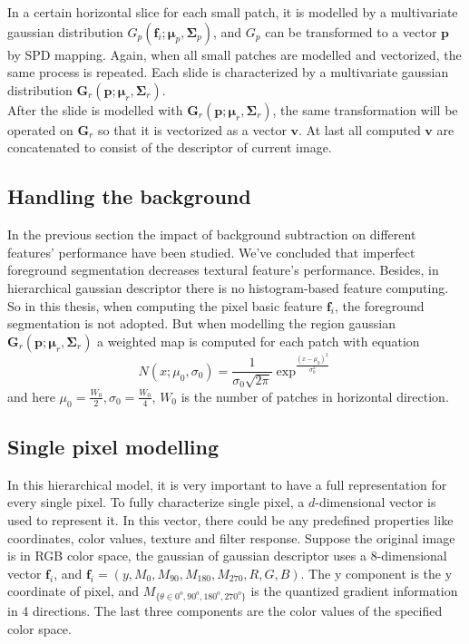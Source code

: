 In a certain horizontal slice for each small patch, it is modelled by a multivariate gaussian distribution $G_p(\bm{f}_i;\bm{\mu}_p,\bm{\Sigma}_p)$, and $G_p$ can be transformed to a vector $\bm{p}$ by SPD mapping. Again, when all small patches are modelled and vectorized, the same process is repeated. Each slide is characterized by a multivariate gaussian distribution $\bm{G}_r(\bm{p};\bm{\mu}_r,\bm{\Sigma}_r)$.\\
\indent After the slide is modelled with $\bm{G}_r(\bm{p};\bm{\mu}_r,\bm{\Sigma}_r)$, the same transformation will be operated on $\bm{G}_r$ so that it is vectorized as a vector $\bm{v}$. At last all computed $\bm{v}$ are concatenated to consist of the descriptor of current image. 

\subsection{Handling the background}
In the previous section the impact of background subtraction on different features' performance have been studied. We've concluded that imperfect foreground segmentation decreases textural feature's performance. Besides, in hierarchical gaussian descriptor there is no histogram-based feature computing. So in this thesis, when computing the pixel basic feature $\bm{f}_i$, the foreground segmentation is not adopted. But when modelling the region gaussian $\bm{G}_r(\bm{p};\bm{\mu}_r,\bm{\Sigma}_r)$ a weighted map is computed for each patch with equation
\begin{equation} 
N(x;\mu_0,\sigma_0) = \frac{1}{\sigma_0\sqrt{2\pi}} \exp^{\frac{(x - \mu_0)^2}{\sigma_0^2}}
\end{equation}
and here $\mu_0 = \frac{W_0}{2}, \sigma_0 = \frac{W_0}{4}$, $W_0$ is the number of patches in horizontal direction.
\subsection{Single pixel modelling}

In this hierarchical model, it is very important to have a full representation for every single pixel. To fully characterize single pixel, a $d$-dimensional vector is used to represent it. In this vector, there could be any predefined properties like coordinates, color values, texture and filter response. Suppose the original image is in RGB color space, the gaussian of gaussian descriptor uses a 8-dimensional vector $\bm{f}_i$, and 
$\bm{f}_i = (y,M_0,M_{90},M_{180},M_{270},R,G,B)$.
The y component is the y coordinate of pixel, and $M_{\{{\theta}\in{0^o,90^o,180^o,270^o}\}}$ is the quantized gradient information in 4 directions. The last three components are the color values of the specified color space.

